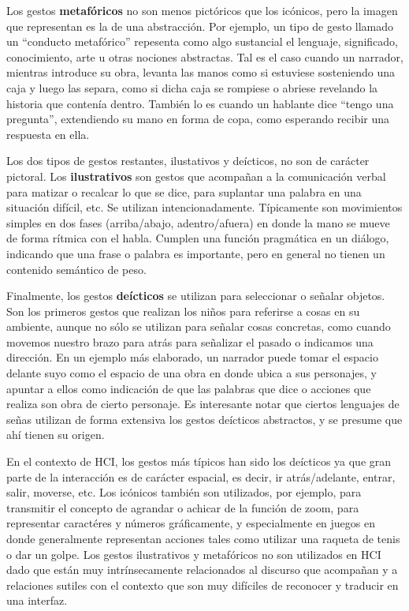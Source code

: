 Los gestos \textbf{metafóricos} no son menos pictóricos que los icónicos, pero la imagen que representan es la de una abstracción. Por ejemplo, un tipo de gesto llamado un ``conducto metafórico'' repesenta como algo sustancial el lenguaje, significado, conocimiento, arte u otras nociones abstractas. Tal es el caso cuando un narrador, mientras introduce su obra, levanta las manos como si estuviese sosteniendo una caja y luego las separa, como si dicha caja se rompiese o abriese revelando la historia que contenía dentro. También lo es cuando un hablante dice ``tengo una pregunta'', extendiendo su mano en forma de copa, como esperando recibir una respuesta en ella. 

Los dos tipos de gestos restantes, ilustativos y deícticos, no son de carácter pictoral. Los \textbf{ilustrativos} son gestos que acompañan a la comunicación verbal para matizar o recalcar lo que se dice, para suplantar una palabra en una situación difícil, etc. Se utilizan intencionadamente. Típicamente son movimientos simples en dos fases (arriba/abajo, adentro/afuera) en donde la mano se mueve de forma rítmica con el habla. Cumplen una función pragmática en un diálogo, indicando que una frase o palabra es importante, pero en general no tienen un contenido semántico de peso.

Finalmente, los gestos \textbf{deícticos} se utilizan para seleccionar o señalar objetos. Son los primeros gestos que realizan los niños para referirse a cosas en su ambiente,  aunque no sólo se utilizan para señalar cosas concretas, como cuando movemos nuestro brazo para atrás para señalizar el pasado o indicamos una dirección. En un ejemplo más elaborado, un narrador puede tomar el espacio delante suyo como el espacio de una obra en donde ubica a sus personajes, y apuntar a ellos como indicación de que las palabras que dice o acciones que realiza son obra de cierto personaje. Es interesante notar que ciertos lenguajes de señas utilizan de forma extensiva los gestos deícticos abstractos, y se presume que ahí tienen su origen.

En el contexto de HCI, los gestos más típicos han sido los deícticos ya que gran parte de la interacción es de carácter espacial, es decir, ir atrás/adelante, entrar, salir, moverse, etc. Los icónicos también son utilizados, por ejemplo, para transmitir el concepto de agrandar o achicar de la función de zoom, para representar caractéres y números gráficamente, y especialmente en juegos en donde generalmente representan acciones tales como utilizar una raqueta de tenis o dar un golpe.
Los gestos ilustrativos y metafóricos no son utilizados en HCI dado que están muy intrínsecamente relacionados al discurso que acompañan y a relaciones sutiles con el contexto que son muy difíciles de reconocer y traducir en una interfaz.

